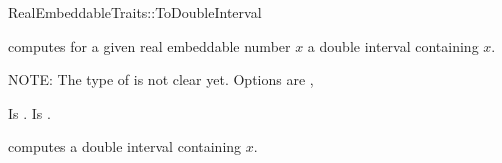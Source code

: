 \begin{ccRefFunctionObjectConcept}{RealEmbeddableTraits::ToDoubleInterval}
\begin{ccAdvanced}
\ccDefinition

 computes for a given real embeddable 
number $x$ a double interval containing $x$. 

NOTE: The type of  is not clear yet. 
      Options are , 
 
\ccRefines 


\ccTypes
{} 
        { Is .}
        { Is .}


\ccOperations
{}
        { computes a double interval containing $x$.}


\ccSeeAlso

\\
\\

\end{ccAdvanced}
\end{ccRefFunctionObjectConcept} 